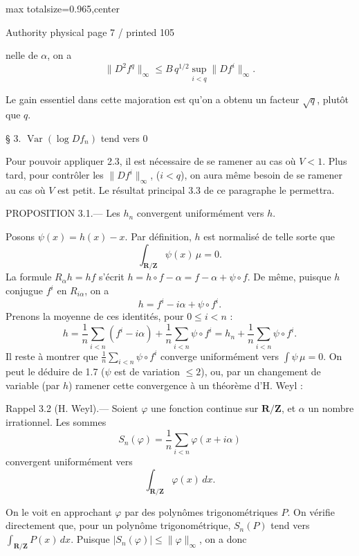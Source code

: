 \documentclass{article}
\begin{document}
\newpage
\noindent\begin{adjustbox}{max totalsize={\textwidth}{0.965\textheight},center}\begin{minipage}{\textwidth}
\noindent\hfill\scriptsize Authority physical page 7 / printed 105\par\normalsize
nelle de \(\alpha\), on a
\[
\|D^2f^q\|_\infty\leq B\,q^{1/2}\sup_{i<q}\|Df^i\|_\infty.
\]

Le gain essentiel dans cette majoration est qu’on a obtenu un facteur \(\sqrt q\), plutôt que \(q\).

§ 3. \(\operatorname{Var}(\log Df_n)\) tend vers \(0\)

Pour pouvoir appliquer 2.3, il est nécessaire de se ramener au cas où \(V<1\). Plus tard, pour contrôler les \(\|Df^i\|_\infty\), (\(i<q\)), on aura même besoin de se ramener au cas où \(V\) est petit. Le résultat principal 3.3 de ce paragraphe le permettra.

PROPOSITION 3.1.— Les \(h_n\) convergent uniformément vers \(h\).

Posons \(\psi(x)=h(x)-x\). Par définition, \(h\) est normalisé de telle sorte que
\[
\int_{\mathbf R/\mathbf Z}\psi(x)\,\mu=0.
\]
La formule \(R_\alpha h=hf\) s’écrit \(h=h\circ f-\alpha=f-\alpha+\psi\circ f\). De même, puisque \(h\) conjugue \(f^i\) en \(R_{i\alpha}\), on a
\[
h=f^i-i\alpha+\psi\circ f^i.
\]
Prenons la moyenne de ces identités, pour \(0\leq i<n\) :
\[
h=\frac1n\sum_{i<n}(f^i-i\alpha)+\frac1n\sum_{i<n}\psi\circ f^i
=h_n+\frac1n\sum_{i<n}\psi\circ f^i.
\]
Il reste à montrer que \(\frac1n\sum_{i<n}\psi\circ f^i\) converge uniformément vers \(\int\psi\,\mu=0\). On peut le déduire de 1.7 (\(\psi\) est de variation \(\leq2\)), ou, par un changement de variable (par \(h\)) ramener cette convergence à un théorème d’H. Weyl :

Rappel 3.2 (H. Weyl).— Soient \(\varphi\) une fonction continue sur \(\mathbf R/\mathbf Z\), et \(\alpha\) un nombre irrationnel. Les sommes
\[
S_n(\varphi)=\frac1n\sum_{i<n}\varphi(x+i\alpha)
\]
convergent uniformément vers
\[
\int_{\mathbf R/\mathbf Z}\varphi(x)\,dx.
\]

On le voit en approchant \(\varphi\) par des polynômes trigonométriques \(P\). On vérifie directement que, pour un polynôme trigonométrique, \(S_n(P)\) tend vers \(\int_{\mathbf R/\mathbf Z}P(x)\,dx\). Puisque \(|S_n(\varphi)|\leq\|\varphi\|_\infty\), on a donc
\end{minipage}\end{adjustbox}
\end{document}
